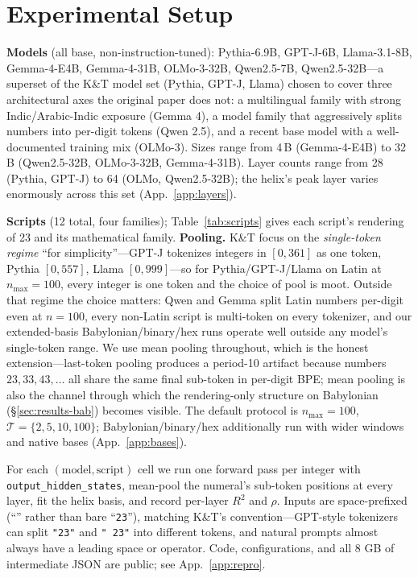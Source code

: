 \documentclass[10pt,letterpaper]{article}
\begin{document}
\section{Experimental Setup}
\label{sec:setup}

\textbf{Models} (all base, non-instruction-tuned): Pythia-6.9B,
GPT-J-6B, Llama-3.1-8B, Gemma-4-E4B, Gemma-4-31B, OLMo-3-32B,
Qwen2.5-7B, Qwen2.5-32B---a superset of the K\&T model set (Pythia,
GPT-J, Llama) chosen to cover three architectural axes the original
paper does not: a multilingual family with strong Indic/Arabic-Indic
exposure (Gemma 4), a model family that aggressively splits numbers
into per-digit tokens (Qwen 2.5), and a recent base model with a
well-documented training mix (OLMo-3). Sizes range from 4\,B
(Gemma-4-E4B) to 32\,B (Qwen2.5-32B, OLMo-3-32B, Gemma-4-31B). Layer
counts range from 28 (Pythia, GPT-J) to 64 (OLMo, Qwen2.5-32B); the
helix's peak layer varies enormously across this set (App.~\ref{app:layers}).

\textbf{Scripts} (12 total, four families); Table~\ref{tab:scripts}
gives each script's rendering of 23 and its mathematical family.
\textbf{Pooling.} K\&T focus on the \emph{single-token regime}
``for simplicity''---GPT-J tokenizes integers in $[0, 361]$ as one
token, Pythia $[0, 557]$, Llama $[0, 999]$---so for Pythia/GPT-J/Llama
on Latin at $n_{\max}=100$, every integer is one token and the
choice of pool is moot. Outside that regime the choice matters:
Qwen and Gemma split Latin numbers per-digit even at $n=100$, every
non-Latin script is multi-token on every tokenizer, and our
extended-basis Babylonian/binary/hex runs operate well outside any
model's single-token range. We use mean pooling throughout, which is
the honest extension---last-token pooling produces a period-10
artifact because numbers $23, 33, 43, \ldots$ all share the same
final sub-token in per-digit BPE; mean pooling is also the channel
through which the rendering-only structure on Babylonian
(\S\ref{sec:results-bab}) becomes visible. The default protocol is
$n_{\max}=100$, $\mathcal{T}=\{2,5,10,100\}$; Babylonian/binary/hex
additionally run with wider windows and native bases
(App.~\ref{app:bases}).

For each $(\text{model}, \text{script})$ cell we run one forward
pass per integer with \texttt{output\_hidden\_states}, mean-pool the
numeral's sub-token positions at every layer, fit the helix basis,
and record per-layer $R^2$ and $\rho$. Inputs are space-prefixed
(``\texttt{}'' rather than bare ``\texttt{23}''),
matching K\&T's convention---GPT-style tokenizers can split
\texttt{"23"} and \texttt{" 23"} into different tokens, and natural
prompts almost always have a leading space or operator. Code, configurations, and
all 8 GB of intermediate JSON are public; see App.~\ref{app:repro}.
\end{document}
